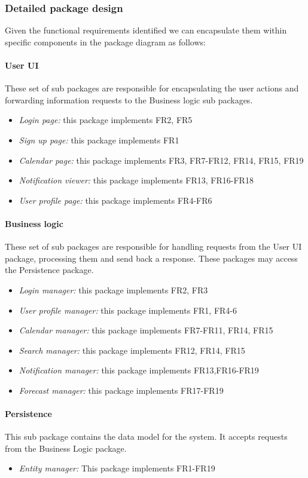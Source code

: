 \documentclass[10pt,a4paper,titlepage]{article}
\begin{document}
\subsubsection{Detailed package design}
Given the functional requirements identified we can encapsulate them within specific components in the package diagram as follows:

\paragraph{User UI}
These set of sub packages are responsible for encapsulating the user actions and forwarding information requests to the Business logic sub packages.
\begin{itemize}
\item \emph{Login page:} this package implements FR2, FR5
\item \emph{Sign up page:} this package implements FR1
\item \emph{Calendar page:} this package implements FR3, FR7-FR12, FR14, FR15, FR19
\item \emph{Notification viewer:} this package implements FR13, FR16-FR18
\item \emph{User profile page:} this package implements FR4-FR6
\end{itemize}

\paragraph{Business logic}
These set of sub packages are responsible for handling requests from the User UI package, processing them and send back a response. These packages may access the Persistence package.
\begin{itemize}
\item \emph{Login manager:} this package implements FR2, FR3
\item \emph{User profile manager:} this package implements FR1, FR4-6
\item \emph{Calendar manager:} this package implements FR7-FR11, FR14, FR15
\item \emph{Search manager:} this package implements FR12, FR14, FR15
\item \emph{Notification manager:} this package implements FR13,FR16-FR19
\item \emph{Forecast manager:} this package implements FR17-FR19
\end{itemize}

\paragraph{Persistence}
This sub package contains the data model for the system. It accepts requests from the Business Logic package.
\begin{itemize}
\item \emph{Entity manager:} This package implements FR1-FR19
\end{itemize}
\end{document}
